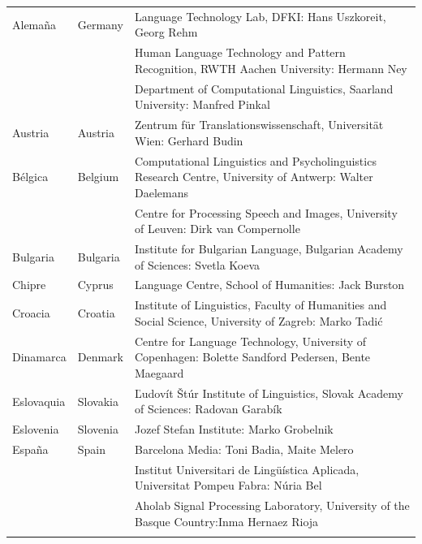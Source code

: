 \begin{longtable}{@{}llp{113mm}@{}}
  Alemaña & \textcolor{grey1}{Germany} & Language Technology Lab, DFKI: Hans Uszkoreit, Georg Rehm\\ \addlinespace
  & & Human Language Technology and Pattern Recognition, RWTH Aachen University: Hermann Ney \\ \addlinespace
  & & Department of Computational Linguistics, Saarland University: Manfred Pinkal\\ \addlinespace
  Austria   & \textcolor{grey1}{Austria} & Zentrum für Translationswissenschaft, Universität Wien: Gerhard Budin\\ \addlinespace 
  Bélgica  & \textcolor{grey1}{Belgium} & Computational Linguistics and Psycholinguistics Research Centre, University of Antwerp: Walter Daelemans\\ \addlinespace
  & & Centre for Processing Speech and Images, University of Leuven: Dirk van Compernolle \\ \addlinespace
  Bulgaria & \textcolor{grey1}{Bulgaria} & Institute for Bulgarian Language, Bulgarian Academy of Sciences: Svetla Koeva \\ \addlinespace
  Chipre  & \textcolor{grey1}{Cyprus} & Language Centre, School of Humanities: Jack Burston \\ \addlinespace
  Croacia   & \textcolor{grey1}{Croatia} & Institute of Linguistics, Faculty of Humanities and Social Science, University of Zagreb: Marko Tadić \\ \addlinespace
  Dinamarca &  \textcolor{grey1}{Denmark} & Centre for Language Technology, University of Copenhagen: \newline Bolette Sandford Pedersen, Bente Maegaard\\ \addlinespace
  Eslovaquia   & \textcolor{grey1}{Slovakia} & Ľudovít Štúr Institute of Linguistics, Slovak Academy of Sciences: Radovan Garabík \\ \addlinespace 
  Eslovenia   & \textcolor{grey1}{Slovenia} & Jozef Stefan Institute: Marko Grobelnik \\ \addlinespace 
  España   & \textcolor{grey1}{Spain} & Barcelona Media: Toni Badia, Maite Melero \\ \addlinespace 
  & & Institut Universitari de Lingüística Aplicada, Universitat Pompeu Fabra: Núria Bel \\ \addlinespace 
  & & Aholab Signal Processing Laboratory, University of the Basque Country:\newline Inma Hernaez Rioja \\ \addlinespace 

\end{longtable}
